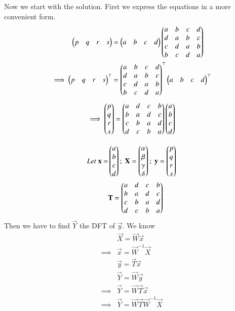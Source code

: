 \documentclass[journal,12pt,twocolumn]{IEEEtran}
\begin{document}
Now we start with the solution. First we express the equations in a more convenient form.
\begin{align}
    \begin{pmatrix}p & q & r & s\end{pmatrix} &= \begin{pmatrix}a & b & c & d\end{pmatrix}\begin{pmatrix}a & b & c & d\\ d & a & b & c\\ c & d & a & b\\b & c & d & a\end{pmatrix}\\
    \implies \begin{pmatrix}p & q & r & s\end{pmatrix}^\top &= \begin{pmatrix}a & b & c & d\\ d & a & b & c\\ c & d & a & b\\b & c & d & a\end{pmatrix}^\top \begin{pmatrix}a & b & c & d\end{pmatrix}^\top
\end{align}
\begin{equation}
    \implies \begin{pmatrix}p \\ q \\ r \\ s\end{pmatrix} = \begin{pmatrix}a & d & c & b\\ b & a & d & c\\ c & b & a & d\\d & c & b & a\end{pmatrix}\begin{pmatrix}a \\ b \\ c \\ d\end{pmatrix}
\end{equation}

\begin{align}
    Let\; \mathbf{x} = &\begin{pmatrix}a \\ b \\ c \\ d\end{pmatrix};\; \mathbf{X} = \begin{pmatrix}\alpha \\ \beta \\ \gamma \\ \delta\end{pmatrix};\; \mathbf{y} = \begin{pmatrix}p \\ q \\ r \\ s\end{pmatrix}\\
    &\mathbf{T} = \begin{pmatrix}a & d & c & b\\ b & a & d & c\\ c & b & a & d\\d & c & b & a\end{pmatrix}
\end{align}
Then we have to find $\vec{Y}$ the DFT of $\vec{y}$. We know
\begin{align}
    &\vec{X} = \vec{W}\vec{x}\\
    \implies &\vec{x} = \vec{W}^{-1} \vec{X}\\
    &\vec{y} = \vec{T}\vec{x}\\
    &\vec{Y} = \vec{W}\vec{y}\\
    \implies &\vec{Y} = \vec{W}\vec{T}\vec{x}\\
    \implies &\vec{Y} = \vec{W}\vec{T}\vec{W}^{-1}\vec{X}
\end{align}
\end{document}
